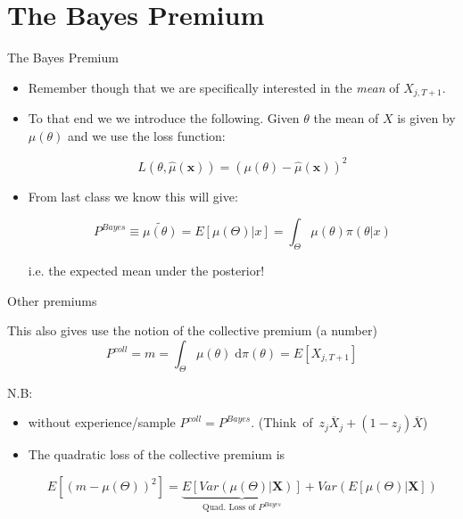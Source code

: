 \documentclass[11pt]{beamer}
\begin{document}
\section{The Bayes Premium}
\begin{frame}{The Bayes Premium}

\begin{itemize}

\item Remember though that we are specifically interested in the \emph{mean} of $X_{j,T+1}$.

\item To that end we we introduce the following. Given $\theta$ the mean of $X$ is given by $\mu(\theta)$ and we use the loss function: 

\begin{equation*}
L(\theta,\hat{\mu}(\mathbf{x}))=\left( \mu(\theta)-\hat{\mu}(\mathbf{x}) \right)^2
\end{equation*}

\item From last class we know this will give:

$$P^{Bayes} \equiv \widetilde{\mu(\theta)} = E\left[ \mu(\Theta)|x\right] = \int_\Theta \mu(\theta) \pi(\theta|x) $$

i.e. the expected mean under the posterior!

\end{itemize}

\end{frame}
\begin{frame}{Other premiums}

This also gives use the notion of the \alert{collective premium} (a number)
$$P^{coll}=m=\int_\Theta \mu(\theta) \;\text{d}\pi(\theta) = E[X_{j,T+1}]$$

N.B:

\begin{itemize}

\item without experience/sample  $P^{coll}=P^{Bayes}$. (Think~of~$z_{j}\overline{X}_{j}+\left(1-z_{j}\right) \overline{X}$)

\vfill

\item The quadratic loss of the collective premium is

$$ E\left[\left( m-\mu(\Theta)\right)^2\right]=\underbrace{E\left[Var(\mu(\Theta)|\mathbf{X})\right]}_{\text{Quad. Loss of } P^{Bayes}}+Var\left(E[\mu(\Theta)|\mathbf{X}]\right)$$

\end{itemize}

\end{frame}
\end{document}
